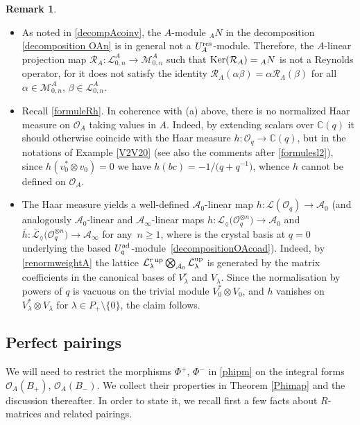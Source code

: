 \documentclass[pdftex]{sigma}
\numberwithin{equation}{section}
\theoremstyle{definition}
\newtheorem{Remark}[teo]{Remark}
\newcommand{\mc}{\mathbb{C}}
\newcommand{\Ll}{{\mathcal L}}
\newcommand{\Mm}{{\mathcal M}}
\newcommand{\Oo}{{\mathcal O}}
\newcommand{\Rr}{{\mathcal R}}
\newcommand{\ra}{\rightarrow}
\begin{document}
\begin{Remark}\label{noHaarRoverA}\quad
\begin{itemize}\itemsep=0pt
\item[$(a)$] As noted in \eqref{decompAcoinv}, the $A$-module ${}_AN$ in the decomposition \eqref{decomposition OAn} is in general not a $U_A^{\rm res}$-module. Therefore, the $A$-linear projection map $\Rr_A\colon \Ll_{0,n}^A\ra \Mm_{0,n}^A$ such that ${\rm Ker}(\Rr_A)={}_AN$ is not a Reynolds operator, for it does not satisfy the identity $\Rr_A(\alpha \beta) = \alpha \Rr_A(\beta)$ for all $\alpha\in \Mm_{0,n}^A$, $\beta \in \Ll_{0,n}^A$.

\item[$(b)$] Recall \eqref{formuleRh}. In coherence with (a) above, there is no normalized Haar measure on $\Oo_A$ taking values in $A$. Indeed, by extending scalars over $\mc(q)$ it should otherwise coincide with the Haar measure $h\colon \Oo_q \ra \mc(q)$, but in the notations of Example \ref{V2V20} (see also the comments after \eqref{formulesl2}), since $h(v_0^* \otimes v_0)=0$ we have $h(bc)=-1/\big(q+q^{-1}\big)$, whence $h$ cannot be defined on $\Oo_A$.

\item[$(c)$] The Haar measure yields a well-defined $\mathcal{A}_0$-linear map $h\colon \Ll(\Oo_q) \ra \mathcal{A}_0$ (and analogously $\mathcal{A}_0$-linear and $\mathcal{A}_\infty$-linear maps $h\colon \Ll_{\lozenge}\big(\Oo_q^{\otimes n}\big) \ra \mathcal{A}_0$ and $\bar{h}\colon \bar{\Ll}_{\lozenge}\big(\Oo_q^{\otimes n}\big) \ra \mathcal{A}_\infty$ for any~$n\geq 1$, where \smash{$\big(\Ll_{\lozenge}\big(\Oo_q^{\otimes n}\big),\mathcal{B}[[\lambda]]^*\big)$} is the crystal basis at $q=0$ underlying the based $U_q^{\rm ad}$-module~\eqref{decompositionOAcoad}). Indeed, by \eqref{renormweightA} the lattice $\Ll_{\lambda}^r {}^{\rm up} \bigotimes_{\mathcal{A}_0} \Ll_{\lambda}^{\rm up}$ is generated by the matrix coefficients in the canonical bases of $V_\lambda^r$ and $V_\lambda$. Since the normalisation by powers of $q$ is vacuous on the trivial module $V_0^* \otimes V_0$, and $h$ vanishes on $V_\lambda^* \otimes V_\lambda$ for $\lambda \in P_+\setminus \{0\}$, the claim follows.
 \end{itemize}
\end{Remark}

\subsection{Perfect pairings}\label{intdual} We will need to restrict the morphisms $\Phi^+$, $\Phi^-$ in \eqref{phipm} on the integral forms $\Oo_A(B_+)$, $\Oo_A(B_-)$. We collect their properties in Theorem \ref{Phimap} and the discussion thereafter. In order to state it, we recall first a few facts about $R$-matrices and related pairings.
\end{document}
